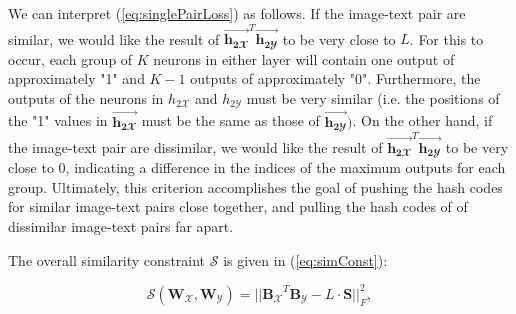 \documentclass[letterpaper]{article}
\newcommand{\bpx}{\mathbf{B_\mathcal{X}}}
\newcommand{\bpy}{\mathbf{B_\mathcal{Y}}}
\newcommand{\WX}{\mathbf{W}_\mathcal{X}}
\newcommand{\WY}{\mathbf{W}_\mathcal{Y}}
\newcommand{\htwoxv}{\vec{\mathbf{h_{2\mathbfcal{X}}}}}
\newcommand{\htwoyv}{\vec{\mathbf{h_{2\mathbfcal{Y}}}}}
\newcommand{\xii}{\mathbf{x}_i}
\newcommand{\yj}{\mathbf{y}_j}
\begin{document}
\begin{comment}
In (\ref{eq:singlePairLoss}), $ L $ is the number of bits in the hash code, and $ \vec{\mathbf{h_{3*}}} $ refers to the vector of output values from the neurons in layer $ h_{3*} $. $ s_{ij} $ refers to the similarity between image $ \xii $ and text $ \yj $, and is given in (\ref{eq:sij}):

\begin{equation}
\label{eq:sij}
s_{ij} = 
\begin{cases} 
1, & \xii~ \text{and}~ \yj~ \text{are similar} \\
0, & \xii~ \text{and}~ \yj~ \text{are not similar}
\end{cases}
\end{equation}

An image-text pair is said to be similar if they share at least one common concept, i.e. class label. If the image and text do not have any common class labels, the pair is said to be dissimilar. It is easy to see from Equation \ref{eq:singlePairLoss} that the result of the subtraction operation in the loss function is bounded by $ [O, L] $. To see this, note that (a) due to the use of the softmax function, $ \htwoxv^T \htwoyv $ is bounded by $ [O, L] $; and (b) $ s_{ij}L $ is always 0 or $ L $.
\end{comment}

We can interpret (\ref{eq:singlePairLoss}) as follows. If the image-text pair are similar, we would like the result of $ \htwoxv^T \htwoyv $ to be very close to $ L $. For this to occur, each group of $ K $ neurons in either layer will contain one output of approximately "1" and $ K - 1 $ outputs of approximately "0". Furthermore, the outputs of the neurons in $ h_{2\mathcal{X}} $ and $ h_{2\mathcal{Y}} $ must be very similar (i.e. the positions of the "1" values in $ \htwoxv $ must be the same as those of $ \htwoyv ) $. On the other hand, if the image-text pair are dissimilar, we would like the result of $ \htwoxv^T \htwoyv $ to be very close to 0, indicating a difference in the indices of the maximum outputs for each group. Ultimately, this criterion accomplishes the goal of pushing the hash codes for similar image-text pairs close together, and pulling the hash codes of of dissimilar image-text pairs far apart. 

The overall similarity constraint $ \mathcal{S} $ is given in (\ref{eq:simConst}):

\begin{equation}
\label{eq:simConst}
\mathcal{S}(\WX, \WY) = \big|\big| \bpx^T \bpy - L \cdot \mathbf{S} \big|\big|_F^2,
\end{equation}
\end{document}
